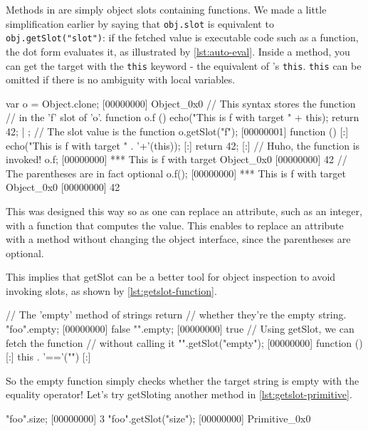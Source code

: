 Methods in \urbi are simply object slots containing functions. We made
a little simplification earlier by saying that \lstinline|obj.slot| is
equivalent to \lstinline|obj.getSlot("slot")|: if the fetched value is
executable code such as a function, the dot form evaluates it, as
illustrated by \autoref{lst:auto-eval}. Inside a method, you can get the
target with the \lstinline|this| keyword - the equivalent of \Cxx's
\texttt{this}. \lstinline|this| can be omitted if there is no
ambiguity with local variables.

\begin{urbiscript}[caption=Function in object are automatically evaluated,
label=lst:auto-eval]
var o = Object.clone;
[00000000] Object_0x0
// This syntax stores the function
// in the 'f' slot of 'o'.
function o.f ()
{
  echo("This is f with target " + this);
  return 42;
} | {};
// The slot value is the function
o.getSlot("f");
[00000001] function () {
[:]  echo("This is f with target " . '+'(this));
[:]  return 42;
[:]}
// Huho, the function is invoked!
o.f;
[00000000] *** This is f with target Object_0x0
[00000000] 42
// The parentheses are in fact optional
o.f();
[00000000] *** This is f with target Object_0x0
[00000000] 42
\end{urbiscript}

This was designed this way so as one can replace an attribute, such as
an integer, with a function that computes the value. This enables to
replace an attribute with a method without changing the object
interface, since the parentheses are optional.

This implies that getSlot can be a better tool for object inspection
to avoid invoking slots, as shown by \autoref{lst:getslot-function}.

\begin{urbiscript}[caption=Inspecting executable slots with \texttt{getSlot},
label=lst:getslot-function]
// The 'empty' method of strings return
// whether they're the empty string.
"foo".empty;
[00000000] false
"".empty;
[00000000] true
// Using getSlot, we can fetch the function
// without calling it
"".getSlot("empty");
[00000000] function () {
[:]  this . '=='("")
[:]}
\end{urbiscript}

So the empty function simply checks whether the target string is empty
with the equality operator! Let's try getSloting another method in
\autoref{lst:getslot-primitive}.

\begin{urbiscript}[caption=Primitives, label=lst:getslot-primitive]
"foo".size;
[00000000] 3
"foo".getSlot("size");
[00000000] Primitive_0x0
\end{urbiscript}


